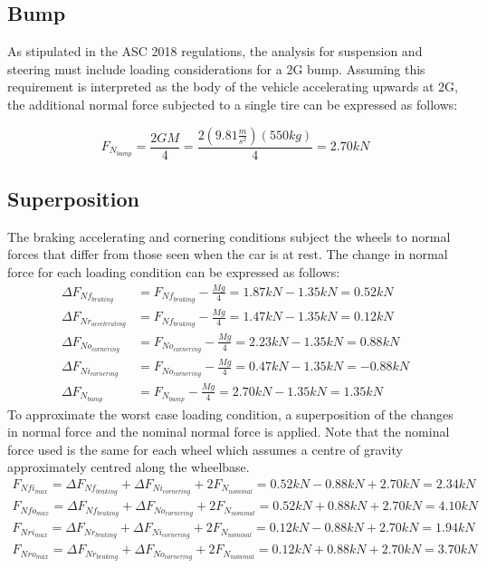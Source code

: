 \documentclass[12pt]{article}
\begin{document}
\subsection{Bump}
As stipulated in the ASC 2018 regulations, the analysis for suspension and steering must include loading considerations for a 2G bump. Assuming this requirement is interpreted as the body of the vehicle accelerating upwards at 2G, the additional normal force subjected to a single tire can be expressed as follows: 

\begin{equation}
	F_{N_{bump}} = \frac{2GM}{4} = \frac{2(9.81\frac{m}{s^2})(550kg)}{4} = 2.70kN
\end{equation} 
 
\subsection{Superposition}
The braking accelerating and cornering conditions subject the wheels to normal forces that differ from those seen when the car is at rest. The change in normal force for each loading condition can be expressed as follows: 
\begin{equation}
	\begin{split}
		\Delta F_{Nf_{braking}} &= F_{Nf_{braking}} - \frac{Mg}{4} =  1.87kN - 1.35kN = 0.52kN\\
		\Delta F_{Nr_{accelerating}} &= F_{Nf_{braking}} - \frac{Mg}{4} =  1.47kN - 1.35kN = 0.12kN\\
		\Delta F_{No_{cornering}} &=  F_{No_{cornering}} - \frac{Mg}{4} =  2.23kN - 1.35kN = 0.88kN\\
		\Delta F_{Ni_{cornering}} &=  F_{No_{cornering}} - \frac{Mg}{4} =  0.47kN - 1.35kN = -0.88kN\\
		\Delta F_{N_{bump}} &= F_{N_{bump}} - \frac{Mg}{4} =  2.70kN - 1.35kN = 1.35kN
	\end{split}
\end{equation}
To approximate the worst case loading condition, a superposition of the changes in normal force and the nominal normal force is applied. Note that the nominal force used is the same for each wheel which assumes a centre of gravity approximately centred along the wheelbase.
\begin{equation}
	\begin{split}	
	F_{Nfi_{max}} = \Delta F_{Nf_{braking}} + \Delta F_{Ni_{cornering}} + 2F_{N_{nominal}} = 0.52kN - 0.88kN + 2.70kN = 2.34kN \\
	F_{Nfo_{max}} = \Delta F_{Nf_{braking}} + \Delta F_{No_{cornering}} + 2F_{N_{nominal}} = 0.52kN + 0.88kN + 2.70kN = 4.10kN \\
	F_{Nri_{max}} = \Delta F_{Nr_{braking}} + \Delta F_{Ni_{cornering}} + 2F_{N_{nominal}} = 0.12kN - 0.88kN + 2.70kN = 1.94kN \\
	F_{Nro_{max}} = \Delta F_{Nr_{braking}} + \Delta F_{No_{cornering}} + 2F_{N_{nominal}} = 0.12kN + 0.88kN + 2.70kN = 3.70kN 
	\end{split}
\end{equation}
\end{document}
